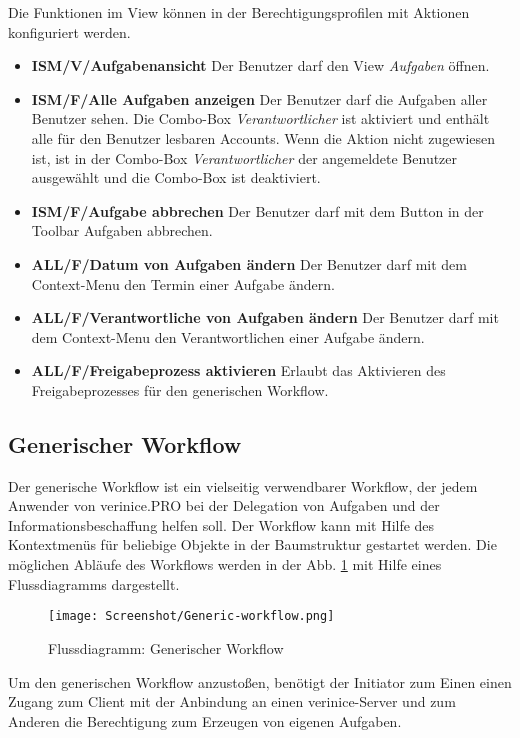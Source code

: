 \documentclass[a4paper,10pt]{book}
\begin{document}
Die Funktionen im View können in der Berechtigungsprofilen mit Aktionen konfiguriert werden.
\begin{itemize}
 \item \textbf{ISM/V/Aufgabenansicht} Der Benutzer darf den View \textit{Aufgaben} öffnen.
 \item \textbf{ISM/F/Alle Aufgaben anzeigen} Der Benutzer darf die Aufgaben aller Benutzer sehen. Die Combo-Box \textit{Verantwortlicher} ist aktiviert und enthält alle für den Benutzer lesbaren Accounts. Wenn die Aktion nicht zugewiesen ist, ist in der Combo-Box \textit{Verantwortlicher} der angemeldete Benutzer ausgewählt und die Combo-Box ist deaktiviert.
 \item \textbf{ISM/F/Aufgabe abbrechen} Der Benutzer darf mit dem Button in der Toolbar Aufgaben abbrechen.
 \item \textbf{ALL/F/Datum von Aufgaben ändern} Der Benutzer darf mit dem Context-Menu den Termin einer Aufgabe ändern.
 \item \textbf{ALL/F/Verantwortliche von Aufgaben ändern} Der Benutzer darf mit dem Context-Menu den Verantwortlichen einer Aufgabe ändern.
 \item \textbf{ALL/F/Freigabeprozess akti\-vie\-ren} Erlaubt das
   Aktivieren des Freigabeprozesses für den generischen Workflow.
\end{itemize}

\subsection{Generischer Workflow}
Der generische Workflow ist ein vielseitig verwendbarer Workflow, der jedem Anwender von verinice.\textsc{PRO} bei der Delegation von Aufgaben und der
Informationsbeschaffung helfen soll. Der Workflow kann mit Hilfe des Kontextmenüs für beliebige Objekte in der Baumstruktur gestartet werden.
Die möglichen Abläufe des Workflows werden in der Abb. \ref{Flussdiagramm: Generischer Workflow} mit Hilfe eines Flussdiagramms dargestellt.
\begin{figure}[htb!]
  \centering
  \texttt{[image: Screenshot/Generic-workflow.png]}
  \caption{\label{Flussdiagramm: Generischer Workflow} Flussdiagramm: Generischer Workflow}
\end{figure}
Um den generischen Workflow anzustoßen, benötigt der Initiator zum Einen einen Zugang zum Client mit der Anbindung an einen verinice-Server und zum Anderen
die Berechtigung zum Erzeugen von eigenen Aufgaben.\\
\end{document}
